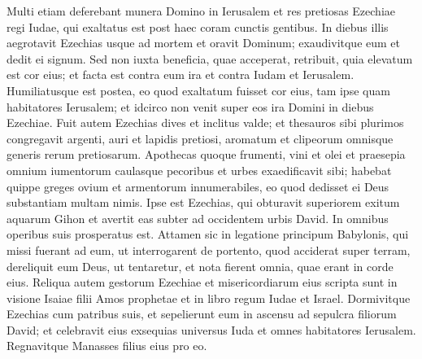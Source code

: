 \begin{biblechapter}
\begin{biblechapter}
\begin{biblechapter}
\begin{biblechapter}
\begin{biblechapter}
\begin{biblechapter}
\begin{biblechapter}
\begin{biblechapter}
\begin{biblechapter}
\begin{biblechapter}
\begin{biblechapter}
\begin{biblechapter}
\begin{biblechapter}
\begin{biblechapter}
\begin{biblechapter}
\begin{biblechapter}
\begin{biblechapter}
\begin{biblechapter}
\begin{biblechapter}
\begin{biblechapter}
\begin{biblechapter}
\begin{biblechapter}
\begin{biblechapter}
\begin{biblechapter}
\begin{biblechapter}
\begin{biblechapter}
\begin{biblechapter}
\begin{biblechapter}
\begin{biblechapter}
\begin{biblechapter}
\begin{biblechapter}
\begin{biblechapter}
\verse Multi etiam deferebant munera Domino in Ierusalem et res pretiosas Ezechiae regi Iudae, qui exaltatus est post haec coram cunctis gentibus.
 \verse In diebus illis aegrotavit Ezechias usque ad mortem et oravit Dominum; exaudivitque eum et dedit ei signum. 
\verse Sed non iuxta beneficia, quae acceperat, retribuit, quia elevatum est cor eius; et facta est contra eum ira et contra Iudam et Ierusalem. 
\verse Humiliatusque est postea, eo quod exaltatum fuisset cor eius, tam ipse quam habitatores Ierusalem; et idcirco non venit super eos ira Domini in diebus Ezechiae.
 \verse Fuit autem Ezechias dives et inclitus valde; et thesauros sibi plurimos congregavit argenti, auri et lapidis pretiosi, aromatum et clipeorum omnisque generis rerum pretiosarum. 
\verse Apothecas quoque frumenti, vini et olei et praesepia omnium iumentorum caulasque pecoribus 
\verse et urbes exaedificavit sibi; habebat quippe greges ovium et armentorum innumerabiles, eo quod dedisset ei Deus substantiam multam nimis.
 \verse Ipse est Ezechias, qui obturavit superiorem exitum aquarum Gihon et avertit eas subter ad occidentem urbis David. In omnibus operibus suis prosperatus est. 
\verse Attamen sic in legatione principum Babylonis, qui missi fuerant ad eum, ut interrogarent de portento, quod acciderat super terram, dereliquit eum Deus, ut tentaretur, et nota fierent omnia, quae erant in corde eius.
 \verse Reliqua autem gestorum Ezechiae et misericordiarum eius scripta sunt in visione Isaiae filii Amos prophetae et in libro regum Iudae et Israel. 
\verse Dormivitque Ezechias cum patribus suis, et sepelierunt eum in ascensu ad sepulcra filiorum David; et celebravit eius exsequias universus Iuda et omnes habitatores Ierusalem. Regnavitque Manasses filius eius pro eo.
 

\end{biblechapter}
\end{biblechapter}
\end{biblechapter}
\end{biblechapter}
\end{biblechapter}
\end{biblechapter}
\end{biblechapter}
\end{biblechapter}
\end{biblechapter}
\end{biblechapter}
\end{biblechapter}
\end{biblechapter}
\end{biblechapter}
\end{biblechapter}
\end{biblechapter}
\end{biblechapter}
\end{biblechapter}
\end{biblechapter}
\end{biblechapter}
\end{biblechapter}
\end{biblechapter}
\end{biblechapter}
\end{biblechapter}
\end{biblechapter}
\end{biblechapter}
\end{biblechapter}
\end{biblechapter}
\end{biblechapter}
\end{biblechapter}
\end{biblechapter}
\end{biblechapter}
\end{biblechapter}
